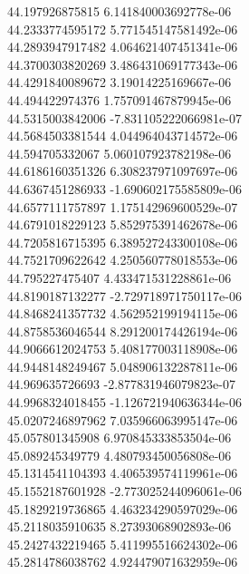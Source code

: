 {44.197926875815 6.141840003692778e-06 \\
44.2333774595172 5.771545147581492e-06 \\
44.2893947917482 4.064621407451341e-06 \\
44.3700303820269 3.486431069177343e-06 \\
44.4291840089672 3.19014225169667e-06 \\
44.494422974376 1.757091467879945e-06 \\
44.5315003842006 -7.831105222066981e-07 \\
44.5684503381544 4.044964043714572e-06 \\
44.594705332067 5.060107923782198e-06 \\
44.6186160351326 6.308237971097697e-06 \\
44.6367451286933 -1.690602175585809e-06 \\
44.6577111757897 1.175142969600529e-07 \\
44.6791018229123 5.852975391462678e-06 \\
44.7205816715395 6.389527243300108e-06 \\
44.7521709622642 4.250560778018553e-06 \\
44.795227475407 4.433471531228861e-06 \\
44.8190187132277 -2.729718971750117e-06 \\
44.8468241357732 4.562952199194115e-06 \\
44.8758536046544 8.291200174426194e-06 \\
44.9066612024753 5.408177003118908e-06 \\
44.9448148249467 5.048906132287811e-06 \\
44.969635726693 -2.877831946079823e-07 \\
44.9968324018455 -1.126721940636344e-06 \\
45.0207246897962 7.035966063995147e-06 \\
45.057801345908 6.970845333853504e-06 \\
45.089245349779 4.480793450056808e-06 \\
45.1314541104393 4.406539574119961e-06 \\
45.1552187601928 -2.773025244096061e-06 \\
45.1829219736865 4.463234290597029e-06 \\
45.2118035910635 8.27393068902893e-06 \\
45.2427432219465 5.411995516624302e-06 \\
45.2814786038762 4.924479071632959e-06 \\
}
